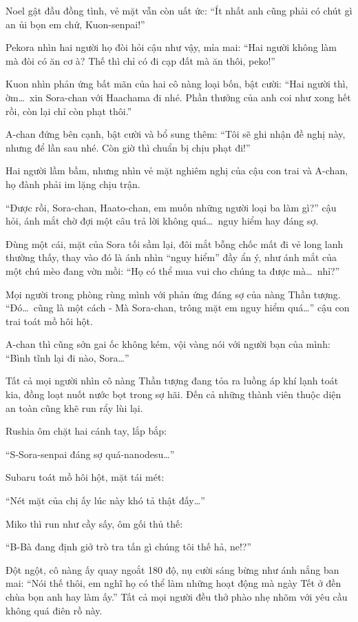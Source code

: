 \documentclass[../main.tex]{subfiles}
\begin{document}
Noel gật đầu đồng tình, vẻ mặt vẫn còn uất ức: ``Ít nhất anh cũng phải có chút gì an ủi bọn em chứ, Kuon-senpai!''

Pekora nhìn hai người họ đòi hỏi cậu như vậy, mỉa mai: ``Hai người không làm mà đòi có ăn cơ à? Thế thì chỉ có đi cạp đất mà ăn thôi, peko!''

Kuon nhìn phản ứng bất mãn của hai cô nàng loại bốn, bật cười: ``Hai người thì, ờm\dots\ xin Sora-chan với Haachama đi nhé. Phần thưởng của anh coi như xong hết rồi, còn lại chỉ còn phạt thôi.''

A-chan đứng bên cạnh, bật cười và bổ sung thêm: ``Tôi sẽ ghi nhận đề nghị này, nhưng để lần sau nhé. Còn giờ thì chuẩn bị chịu phạt đi!''

Hai người lầm bầm, nhưng nhìn vẻ mặt nghiêm nghị của cậu con trai và A-chan, họ đành phải im lặng chịu trận.

``Được rồi, Sora-chan, Haato-chan, em muốn những người loại ba làm gì?'' cậu hỏi, ánh mắt chờ đợi một câu trả lời không quá\dots\ nguy hiểm hay đáng sợ.

Đùng một cái, mặt của Sora tối sầm lại, đôi mắt bỗng chốc mất đi vẻ long lanh thường thấy, thay vào đó là ánh nhìn ``nguy hiểm'' đầy ẩn ý, như ánh mắt của một chú mèo đang vờn mồi: ``Họ có thể mua vui cho chúng ta được mà\dots\ nhỉ?''

Mọi người trong phòng rùng mình với phản ứng đáng sợ của nàng Thần tượng. ``Đó\dots\ cũng là một cách - Mà Sora-chan, trông mặt em nguy hiểm quá\dots'' cậu con trai toát mồ hôi hột.

A-chan thì cũng sởn gai ốc không kém, vội vàng nói với người bạn của mình: ``Bình tĩnh lại đi nào, Sora\dots''

Tất cả mọi người nhìn cô nàng Thần tượng đang tỏa ra luồng áp khí lạnh toát kia, đồng loạt nuốt nước bọt trong sợ hãi. Đến cả những thành viên thuộc diện an toàn cũng khẽ run rẩy lùi lại.

Rushia ôm chặt hai cánh tay, lắp bắp:

``S-Sora-senpai đáng sợ quá-nanodesu\dots''

Subaru toát mồ hôi hột, mặt tái mét:

``Nét mặt của chị ấy lúc này khó tả thật đấy\dots''

Miko thì run như cầy sấy, ôm gối thủ thế:

``B-Bà đang định giở trò tra tấn gì chúng tôi thế hả, ne!?''

Đột ngột, cô nàng ấy quay ngoắt 180 độ, nụ cười sáng bừng như ánh nắng ban mai: ``Nói thế thôi, em nghĩ họ có thể làm những hoạt động mà ngày Tết ở đền chùa bọn anh hay làm ấy.'' Tất cả mọi người đều thở phào nhẹ nhõm với yêu cầu không quá điên rồ này.
\end{document}
